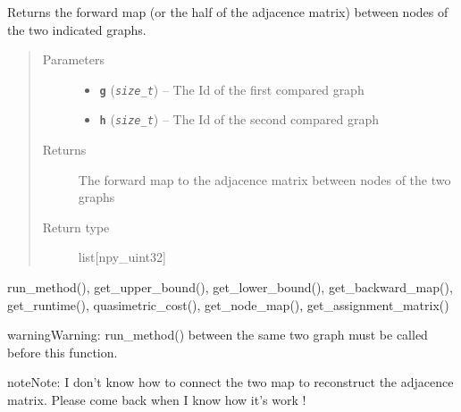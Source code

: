 \documentclass[letterpaper,10pt,english]{sphinxmanual}
\begin{document}

\begin{fulllineitems}
\label{doc:gedlibpy.get_forward_map}
Returns the forward map (or the half of the adjacence matrix) between nodes of the two indicated graphs.
\begin{quote}\begin{description}
\item[{Parameters}] \leavevmode\begin{itemize}
\item {} 
\textbf{\texttt{g}} (\emph{\texttt{size\_t}}) -- The Id of the first compared graph

\item {} 
\textbf{\texttt{h}} (\emph{\texttt{size\_t}}) -- The Id of the second compared graph

\end{itemize}

\item[{Returns}] \leavevmode
The forward map to the adjacence matrix between nodes of the two graphs

\item[{Return type}] \leavevmode
list{[}npy\_uint32{]}

\end{description}\end{quote}




run\_method(), get\_upper\_bound(), get\_lower\_bound(), get\_backward\_map(), get\_runtime(), quasimetric\_cost(), get\_node\_map(), get\_assignment\_matrix()



\begin{notice}{warning}{Warning:}
run\_method() between the same two graph must be called before this function.
\end{notice}

\begin{notice}{note}{Note:}
I don't know how to connect the two map to reconstruct the adjacence matrix. Please come back when I know how it's work !
\end{notice}

\end{fulllineitems}

\end{document}
